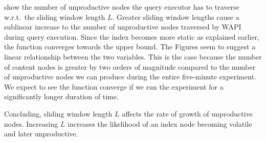 \documentclass[abstracton,12pt]{scrartcl}
\theoremstyle{definition}
\begin{document}
 show the
number of unproductive nodes the query executor has to traverse w.r.t.\ the
sliding window length $L$. Greater sliding window lengths 
cause a sublinear increase to the number of unproductive nodes traversed 
by WAPI during query execution. Since the index becomes more static 
as explained earlier, the function converges towards the upper bound. 
The Figures seem to suggest a linear relationship
between the two variables. This is the case because the number of content nodes is greater
by two orders of magnitude compared to the number of unproductive nodes we can
produce during the entire five-minute experiment. We expect to see the function 
converge if we run the experiment for a significantly longer duration of time.

Concluding, sliding window length $L$ affects the rate of growth of
unproductive nodes.
Increasing $L$ increases the likelihood of an index node becoming volatile
and later unproductive.
\end{document}
